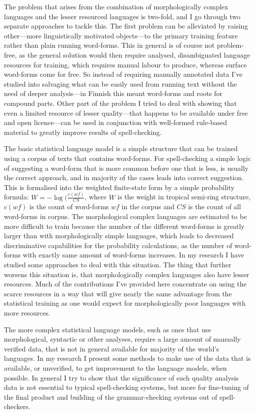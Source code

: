 \documentclass[officiallayout]{unihelcompling}
\begin{document}
The problem that arises from the combination of morphologically complex 
languages and the lesser resourced languages is two-fold, and I go through two
separate approaches to tackle this. The first problem can be alleviated by
raising other---more linguistically motivated objects---to the primary training
feature rather than plain running word-forms. This in general is of course not
problem-free, as the general solution would then require analysed, 
disambiguated language resources for training, which requires manual labour to
produce, whereas surface word-forms come for free. So instead of requiring
manually annotated data I've studied into salvaging what can be easily used
from running text without the need of deeper analysis---in Finnish this meant
word-forms and roots for compound parts. Other part of the problem I tried to
deal with showing that even a limited resource of lesser quality---that
happens to be available under free and open licence---can be used
in conjunction with well-formed rule-based material to greatly improve results
of spell-checking.

The basic statistical language model is a simple structure that can be trained
using a corpus of texts that contains word-forms. For spell-checking a simple
logic of suggesting a word-form that is more common before one that is less, is
usually the correct approach, and in majority of the cases leads into correct
suggestion. This is formalised into the weighted finite-state form by a simple
probability formula: $W = -\log(\frac{c(wf)}{CS}$, where $W$ is the weight in
tropical semi-ring structure, $c(wf)$ is the count of word-forms  $wf$ in the
corpus and $CS$ is the count of all word-forms in corpus. The morphological
complex languages are estimated to be more difficult to train because the
number of the different word-forms is greatly larger than with morphologically
simple languages, which leads to decreased discriminative capabilities for
the probability calculations, as the number of word-forms with exactly same
amount of word-forms increases. In my research I have studied some approaches
to deal with this situation. The thing that further worsens this situation is,
that morphologically complex languages also have lesser resources. Much of the
contributions I've provided here concentrate on using the scarce resources in
a way that will give nearly the same advantage from the statistical training
as one would expect for morphologically poor languages with more resources.

The more complex statistical language models, such as ones that use
morphological, syntactic or other analyses, require a large amount of
manually verified data, that is not in general available for majority of the
world's languages. In my research I present some methods to make use of the
data that is available, or unverified, to get improvement to the language
models, when possible. In general I try to show that the significance of such
quality analysis data is not essential to typical spell-checking systems, but
more for fine-tuning of the final product and building of the grammar-checking
systems out of spell-checkers.
\end{document}
